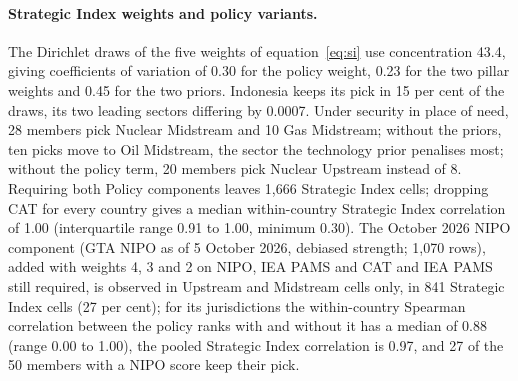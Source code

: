 

\paragraph{Strategic Index weights and policy variants.} The Dirichlet draws of the five weights of
equation~\eqref{eq:si} use concentration 43.4, giving coefficients of variation of 0.30 for the
policy weight, 0.23 for the two pillar weights and 0.45 for the two priors. Indonesia keeps its pick
in 15 per cent of the draws, its two leading sectors differing by 0.0007. Under security in place of
need, 28 members pick Nuclear Midstream and 10 Gas Midstream; without the priors, ten picks move to
Oil Midstream, the sector the technology prior penalises most; without the policy term, 20 members
pick Nuclear Upstream instead of 8. Requiring both Policy components leaves 1{,}666 Strategic Index
cells; dropping CAT for every country gives a median within-country Strategic Index correlation of
1.00 (interquartile range 0.91 to 1.00, minimum 0.30). The October 2026 NIPO component (GTA NIPO as of
5 October 2026, debiased strength; 1{,}070 rows), added with weights 4, 3 and 2 on NIPO, IEA PAMS and
CAT and IEA PAMS still required, is observed in Upstream and Midstream cells only, in 841 Strategic
Index cells (27 per cent); for its jurisdictions the within-country Spearman correlation between the
policy ranks with and without it has a median of 0.88 (range 0.00 to 1.00), the pooled Strategic
Index correlation is 0.97, and 27 of the 50 members with a NIPO score keep their pick.

